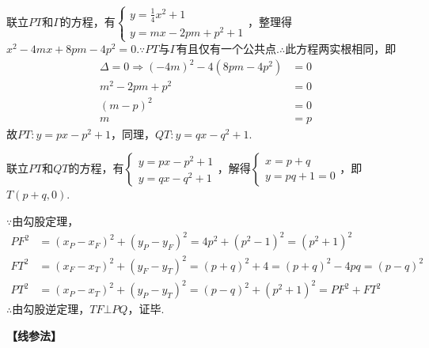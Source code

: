 \documentclass[10pt]{article}
\begin{document}
\begin{questions}{\answeringintroduction}
\begin{subquestions}
        联立$PT$和$\Gamma$的方程，有$\begin{cases}
            y=\frac{1}{4}x^2+1 \\
            y=mx-2pm+p^2+1
        \end{cases}$，整理得$x^2-4mx+8pm-4p^2=0$.$\because PT$与$\Gamma$有且仅有一个公共点.$\therefore$此方程两实根相同，即
        $$\begin{aligned}
            \Delta = 0 \Rightarrow (-4m)^2-4(8pm-4p^2) &= 0 \\
            m^2-2pm+p^2 &= 0 \\
            (m-p)^2 &= 0 \\
            m &= p
        \end{aligned}$$
        故$PT:y=px-p^2+1$，同理，$QT:y=qx-q^2+1$. \par
        联立$PT$和$QT$的方程，有$\begin{cases}
            y=px-p^2+1 \\
            y=qx-q^2+1
        \end{cases}$，解得$\begin{cases}
            x=p+q \\
            y=pq+1=0
        \end{cases}$，即$T(p+q,0)$.\par
        $\because$由勾股定理，
        $$\begin{aligned}
            PF^2 &= (x_P-x_F)^2+(y_P-y_F)^2 = 4p^2+(p^2-1)^2 = (p^2+1)^2 \\
            FT^2 &= (x_F-x_T)^2+(y_F-y_T)^2 = (p+q)^2+4 = (p+q)^2-4pq = (p-q)^2 \\
            PT^2 &= (x_P-x_T)^2+(y_P-y_T)^2 = (p-q)^2+(p^2+1)^2 = PF^2+FT^2
        \end{aligned}$$
        $\therefore$由勾股逆定理，$TF \bot PQ$，证毕.
        \par \textbf{【线参法】} \par
        \begin{figure}[!htb]
            \raggedleft
\end{figure}
\end{subquestions}
\end{questions}
\end{document}
